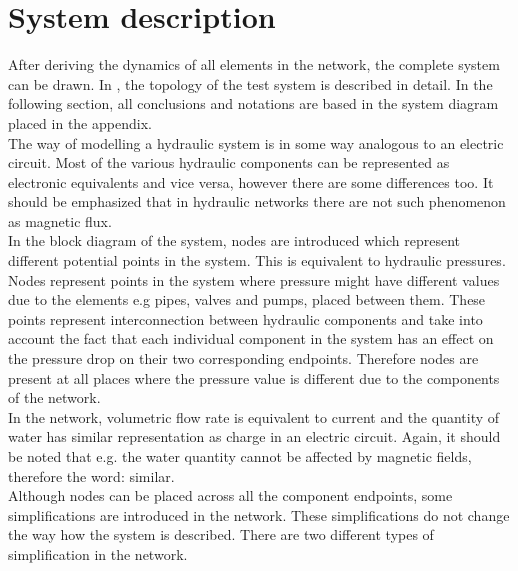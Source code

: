 \section{System description}  
\label{SystemModel}

After deriving the dynamics of all elements in the network, the complete system can be drawn. In , the topology of the test system is described in detail. In the following section, all conclusions and notations are based in the system diagram placed in the appendix. 
\\
The way of modelling a hydraulic system is in some way analogous to an electric circuit. Most of the various hydraulic components can be represented as electronic equivalents and vice versa, however there are some differences too. It should be emphasized that in hydraulic networks there are not such phenomenon as magnetic flux. 
\\
In the block diagram of the system, nodes are introduced which represent different potential points in the system. This is equivalent to hydraulic pressures. Nodes represent points in the system where pressure might have different values due to the elements e.g pipes, valves and pumps, placed between them. These points represent interconnection between hydraulic components and take into account the fact that each individual component in the system has an effect on the pressure drop on their two corresponding endpoints. Therefore nodes are present at all places where the pressure value is different due to the components of the network. 
\\
In the network, volumetric flow rate is equivalent to current and the quantity of water has similar representation as charge in an electric circuit. Again, it should be noted that e.g. the water quantity cannot be affected by magnetic fields, therefore the word: similar.
\\ 
Although nodes can be placed across all the component endpoints, some simplifications are introduced in the network. These simplifications do not change the way how the system is described. There are two different types of simplification in the network. %


